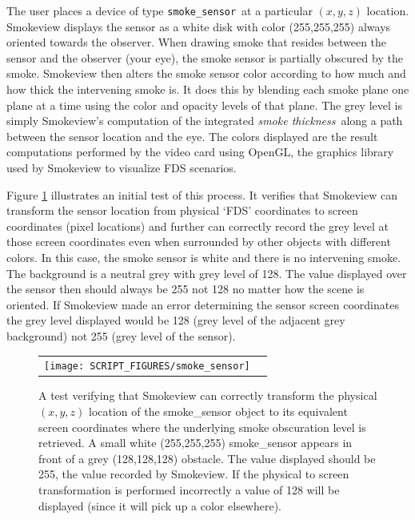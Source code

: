 \documentclass[11pt,twoside]{book}
\begin{document}
The user places a device of type {\tt smoke\_sensor}\ at a particular $(x, y, z)$ location.
Smokeview displays the sensor as a white disk with color (255,255,255)
always oriented towards the observer. When drawing smoke that resides between
the sensor and the observer (your eye), the smoke sensor is partially obscured by the smoke.
Smokeview then alters the smoke sensor color according to how much and how thick the
intervening smoke is.  It does this by blending each smoke plane one plane at a time using
the color and opacity levels of that plane. The grey level is simply Smokeview's
computation of the integrated {\em smoke thickness}\ along a path between the sensor
location and the eye.  The colors displayed are the result computations performed by the
video card using OpenGL, the graphics library used by Smokeview to visualize FDS scenarios.

Figure \ref{figsmokesensor} illustrates an initial test of this process.
It verifies that Smokeview can transform the sensor location from physical
`FDS' coordinates to screen coordinates (pixel locations) and further
can correctly record the grey level at those screen coordinates even when
surrounded by other objects with different colors.
In this case, the smoke sensor is white and there is no intervening smoke.
The background is a neutral grey with grey level of 128.
The value displayed over the sensor then should always be 255 not 128 no matter
how the scene is oriented.
If Smokeview made an error determining the sensor screen coordinates the grey level
displayed would be 128 (grey level of the adjacent grey background) not 255
(grey level of the sensor).

\begin{figure}[bph]
\begin{center}
 \centering
\begin{tabular}{cc}
\texttt{[image: SCRIPT\_FIGURES/smoke\_sensor]}&
 \end{tabular}
\end{center}
\caption[A test verifying that the Smokeview smoke\_sensor object is working properly]
{A test verifying that Smokeview can correctly transform the physical $(x,y,z)$
location of the smoke\_sensor object to its equivalent screen coordinates where
the underlying smoke obscuration level is retrieved. A small white (255,255,255)
smoke\_sensor appears in front of a grey (128,128,128) obstacle. The value displayed
should be 255,  the value recorded by Smokeview.  If the physical to screen
transformation is performed incorrectly a value of 128 will be displayed (since it
will pick up a color elsewhere).
}
\label{figsmokesensor}%
\end{figure}
\end{document}
